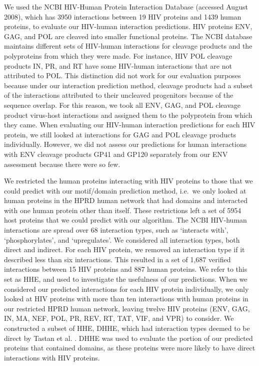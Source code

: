We used the NCBI HIV-Human Protein Interaction Database (accessed
August 2008), which has 3950 interactions between 19 HIV proteins and
1439 human proteins, to evaluate our HIV-human interaction
predictions. HIV proteins ENV, GAG, and POL are cleaved into smaller
functional proteins. The NCBI database maintains different sets of
HIV-human interactions for cleavage products and the polyproteins from
which they were made. For instance, HIV POL cleavage products IN, PR,
and RT have some HIV-human interactions that are not attributed to
POL. This distinction did not work for our evaluation purposes because
under our interaction prediction method, cleavage products had a
subset of the interactions attributed to their uncleaved progenitors
because of the sequence overlap. For this reason, we took all ENV,
GAG, and POL cleavage product virus-host interactions and assigned
them to the polyprotein from which they came. When evaluating our
HIV-human interaction predictions for each HIV protein, we still
looked at interactions for GAG and POL cleavage products
individually. However, we did not assess our predictions for human
interactions with ENV cleavage products GP41 and GP120 separately from
our ENV assessment because there were so few.

We restricted the human proteins interacting with HIV proteins to
those that we could predict with our motif/domain prediction method,
i.e.\ we only looked at human proteins in the HPRD human network that
had domains and interacted with one human protein other than
itself. These restrictions left a set of 5954 host proteins that we
could predict with our algorithm. The NCBI HIV-human interactions are
spread over 68 interaction types, such as `interacts with',
`phosphorylates', and `upregulates'. We considered all interaction
types, both direct and indirect. For each HIV protein, we removed an
interaction type if it described less than six interactions. This
resulted in a set of 1,687 verified interactions between 15 HIV
proteins and 887 human proteins. We refer to this set as HHE, and used
to investigate the usefulness of our predictions. When we considered
our predicted interactions for each HIV protein individually, we only
looked at HIV proteins with more than ten interactions with human
proteins in our restricted HPRD human network, leaving twelve HIV
proteins (ENV, GAG, IN, MA, NEF, POL, PR, REV, RT, TAT, VIF, and VPR)
to consider. We constructed a subset of HHE, DHHE, which had
interaction types deemed to be direct by Tastan et
al. \cite{tastan09}. DHHE was used to evaluate the portion of our
predicted proteins that contained domains, as these proteins were more
likely to have direct interactions with HIV proteins.

